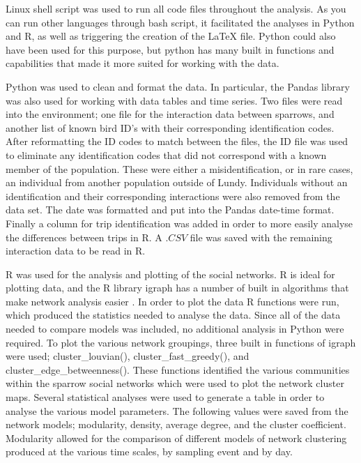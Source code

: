 \documentclass[11pt]{article}
\begin{document}
\par Linux shell script was used to run all code files throughout the analysis.  As you can run other languages through bash script, it facilitated the analyses in Python and R, as well as triggering the creation of the \LaTeX{} file.  Python could also have been used for this purpose, but python has many built in functions and capabilities that made it more suited for working with the data.
\par Python was used to clean and format the data.  In particular, the Pandas library was also used for working with data tables and time series.  Two files were read into the environment; one file for the interaction data between sparrows, and another list of known bird ID’s with their corresponding identification codes.   After reformatting the ID codes to match between the files, the ID file was used to eliminate any identification codes that did not correspond with a known member of the population.  These were either a misidentification, or in rare cases, an individual from another population outside of Lundy.  Individuals without an identification and their corresponding interactions were also removed from the data set.  The date was formatted and put into the Pandas date-time format.  Finally a column for trip identification was added in order to more easily analyse the differences between trips in R.  A $.CSV$ file was saved with the remaining interaction data to be read in R.
\par R was used for the analysis and plotting of the social networks.  R is ideal for plotting data, and the R library igraph has a number of built in algorithms that make network analysis easier \citep{R}.  In order to plot the data R functions were run, which produced the statistics needed to analyse the data.  Since all of the data needed to compare models was included, no additional analysis in Python were required.  To plot the various network groupings, three built in functions of igraph were used; cluster\_louvian(), cluster\_fast\_greedy(), and cluster\_edge\_betweenness().  These functions identified the various communities within the sparrow social networks which were used to plot the network cluster maps.  Several statistical analyses were used to generate a table in order to analyse the various model parameters.  The following values were saved from the network models; modularity, density, average degree, and the cluster coefficient.  Modularity allowed for the comparison of different models of network clustering produced at the various time scales, by sampling event and by day.  
\end{document}
